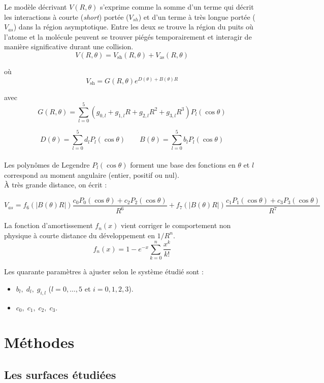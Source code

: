 \documentclass[11pt, a4paper, openany]{report}
\begin{document}
\noindent Le modèle décrivant $V(R,\theta)$ s'exprime comme la somme d'un 
terme qui décrit les interactions à courte (\textit{short}) portée ($V_{sh}$) et d'un terme 
à très longue portée ($V_{as}$) dans la région asymptotique. Entre les deux se 
trouve la région du puits où l’atome et la molécule peuvent se trouver piégés
temporairement et interagir de manière significative durant une collision.\\
$$\boxed{V(R,\theta)=V_{\mathrm{sh}}(R,\theta) + V_{\mathrm{as}}(R,\theta)}$$

où $$V_{\mathrm{sh}}=G(R,\theta)e^{D(\theta)+B(\theta)R}$$

avec $$G(R,\theta) = \sum_{l=0}^{5} (g_{0,l}+g_{1,l}R+g_{2,l}R^2+g_{3,l}R^3)P_l(\cos\theta)$$

$$D(\theta)=\sum\limits_{l=0}^{5}d_lP_l(\cos\theta) \qquad B(\theta)=\sum\limits_{l=0}^{5}b_lP_l(\cos\theta)$$\\


\noindent Les polynômes de Legendre $P_l(\cos\theta)$ forment une base des fonctions en $\theta$ et $l$
correspond au moment angulaire (entier, positif ou nul).\\ 

\noindent À très grande distance, on écrit :

$$V_{as}=f_6(\vert B(\theta)R\vert)\frac{c_0P_0(\cos\theta)+c_2P_2(\cos\theta)}{R^6}
  +f_7(\vert B(\theta)R\vert)\frac{c_1P_1(\cos\theta)+c_3P_3(\cos\theta)}{R^7}$$

\noindent La fonction d'amortissement $f_{n}(x)$ vient corriger le comportement non 
physique à courte distance du développement en $1/R^{n}$.
$$f_n(x)=1-e^{-x}\sum_{k=0}^{n}\frac{x^k}{k!}$$

\noindent Les quarante paramètres à ajuster selon le système étudié sont :
\begin{itemize}
  \item $b_{l},\;d_{l},\;g_{i,l}$ ($l=0,\dots,5$ et $i=0,1,2,3$).
  \item $c_{0},\; c_{1},\; c_{2},\; c_{3}$.
\end{itemize}

\newpage{}

\chapter{Méthodes}

\section{Les surfaces étudiées}
\end{document}
